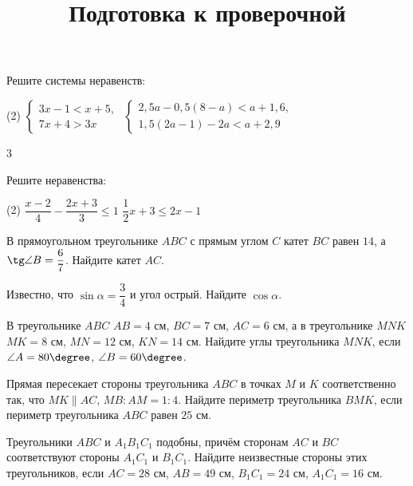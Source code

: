 \begin{homework}[number=3]
	\begin{listofex}
		\item Решите системы неравенств:
		\begin{tasks}(2)
			\task \( \left\{
			\begin{array}{l}
				3x-1<x+5,\\
				7x+4>3x
			\end{array}
			\right. \)
			\task \( \left\{
			\begin{array}{l}
				2,5a-0,5(8-a)<a+1,6,\\
				1,5(2a-1)-2a<a+2,9	
			\end{array}
			\right. \)
		\end{tasks}
		\item \exercise{2597}
		\item \exercise{2599}
		\item \exercise{2604}
	\end{listofex}3
\end{homework}

\begin{class}[number=7]
	\title{Подготовка к проверочной}
	\begin{listofex}
		\item Решите неравенства: 
		\begin{tasks}(2)
			\task \( \dfrac{x-2}{4}-\dfrac{2x+3}{3}\le1 \)
			\task \( \dfrac{1}{2}x+3\le2x-1 \)
		\end{tasks}
		\item \exercise{2596}
		\item В прямоугольном треугольнике \( ABC \) с прямым углом \( C \) катет \( BC \) равен \( 14 \), а \( \tg\angle B=\dfrac{6}{7} \). Найдите катет \( AC \).
		\item Известно, что \( \sin\alpha=\dfrac{3}{4} \) и угол острый. Найдите \( \cos\alpha \).
		\item В треугольнике \( ABC \) \( AB=4 \) см, \( BC=7 \) см, \( AC=6 \) см, а в треугольнике \( MNK \) \( MK=8 \) см, \( MN=12 \) см, \( KN=14 \) см. Найдите углы треугольника \( MNK \), если \( \angle A=80\degree \), \( \angle B=60\degree \).
		\item Прямая пересекает стороны треугольника \( ABC \) в точках \( M \) и \( K \) соответственно так, что \( MK\parallel AC \), \( MB:AM=1:4 \). Найдите периметр треугольника \( BMK \), если периметр треугольника \( ABC \) равен \( 25 \) см.
		\item Треугольники \( ABC \) и \( A_1B_1C_1 \) подобны, причём сторонам \( AC \) и \( BC \) соответствуют стороны \( A_1C_1 \) и \( B_1C_1 \). Найдите неизвестные стороны этих треугольников, если \( AC=28 \) см, \( AB=49 \) см, \( B_1C_1=24 \) см, \( A_1C_1=16 \) см.
	\end{listofex}
\end{class}

